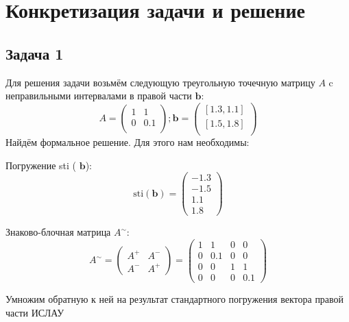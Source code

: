 \documentclass[12pt,a4paper]{scrartcl}
\begin{document}
\section{Конкретизация задачи и решение}
\subsection{Задача 1}

Для решения задачи возьмём следующую треугольную точечную матрицу $A$ c неправильными интервалами в правой части $\textbf{b}$:
\begin{equation}
    A = \begin{pmatrix}
    1 & 1 \\
    0 & 0.1 \\
    \end{pmatrix};
    \textbf{b} = \begin{pmatrix}
    [1.3, 1.1] \\
    [1.5, 1.8] \\
    \end{pmatrix}
\end{equation}
Найдём формальное решение. Для этого нам необходимы:

Погружение sti ( $\textbf{b}$):
\begin{equation}
    \mathrm{sti}(\textbf{b}) = \begin{pmatrix}
    -1.3 \\
    -1.5 \\
    1.1 \\
    1.8 
    \end{pmatrix}
    \label{sti-vector}
\end{equation}

Знаково-блочная матрица $A^{\sim}$:
\begin{equation}
    A^{\sim} =
 \begin{pmatrix}
    A^+ & A^- \\
    A^- & A^+
\end{pmatrix} =
 \begin{pmatrix}
	1 & 1 & 0 & 0 \\
	0 & 0.1 & 0 & 0 \\
	0 & 0 & 1 & 1 \\
	0 & 0 & 0 & 0.1
\end{pmatrix}
    \label{sign-block}
\end{equation}

Умножим обратную к ней на результат стандартного погружения
вектора правой части ИСЛАУ
\end{document}
